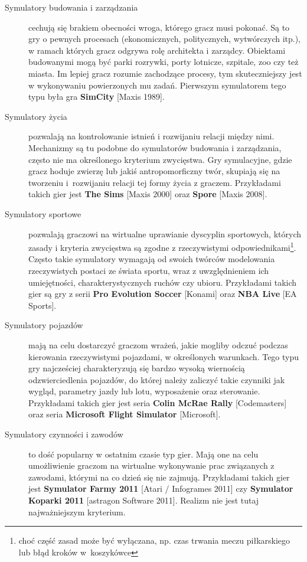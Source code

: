 \begin{description}
	\item[Symulatory budowania i zarządzania] cechują się brakiem obecności wroga, którego gracz musi pokonać. Są to gry o pewnych procesach (ekonomicznych, politycznych, wytwórczych itp.), w ramach których gracz odgrywa rolę architekta i zarządcy. Obiektami budowanymi mogą być parki rozrywki, porty lotnicze, szpitale, zoo czy też miasta. Im lepiej gracz rozumie zachodzące procesy, tym skuteczniejszy jest w wykonywaniu powierzonych mu zadań. Pierwszym symulatorem tego typu była gra \textbf{SimCity} [Maxis 1989].
	\item[Symulatory życia] pozwalają na kontrolowanie istnień i rozwijaniu relacji między nimi. Mechanizmy są tu podobne do symulatorów budowania i zarządzania, często nie ma określonego kryterium zwycięstwa. Gry symulacyjne, gdzie gracz hoduje zwierzę lub jakiś antropomorficzny twór, skupiają się na tworzeniu i~rozwijaniu relacji tej formy życia z graczem. Przykładami takich gier jest \textbf{The Sims} [Maxis 2000] oraz \textbf{Spore} [Maxis 2008].
	\item[Symulatory sportowe] pozwalają graczowi na wirtualne uprawianie dyscyplin sportowych, których zasady i kryteria zwycięstwa są zgodne z rzeczywistymi odpowiednikami\footnote{choć część zasad może być wyłączana, np. czas trwania meczu piłkarskiego lub błąd kroków w~koszykówce}. Często takie symulatory wymagają od swoich twórców modelowania rzeczywistych postaci ze świata sportu, wraz z uwzględnieniem ich umiejętności, charakterystycznych ruchów czy ubioru. Przykładami takich gier są gry z serii \textbf{Pro Evolution Soccer} [Konami] oraz \textbf{NBA Live} [EA Sports].
	\item[Symulatory pojazdów] mają na celu dostarczyć graczom wrażeń, jakie mogliby odczuć podczas kierowania rzeczywistymi pojazdami, w określonych warunkach. Tego typu gry najcześciej charakteryzują się bardzo wysoką wiernością odzwierciedlenia pojazdów, do której należy zaliczyć takie czynniki jak wygląd, parametry jazdy lub lotu, wyposażenie oraz sterowanie. Przykładami takich gier jest seria \textbf{Colin McRae Rally} [Codemasters] oraz seria \textbf{Microsoft Flight Simulator} [Microsoft].
	\item[Symulatory czynności i zawodów] to dość popularny w ostatnim czasie typ gier. Mają one na celu umożliwienie graczom na wirtualne wykonywanie prac związanych z zawodami, którymi na co dzień się nie zajmują. Przykładami takich gier jest \textbf{Symulator Farmy 2011} [Atari / Infogrames 2011] czy \textbf{Symulator Koparki 2011} [astragon Software 2011]. Realizm nie jest tutaj najważniejszym kryterium.
\end{description}

